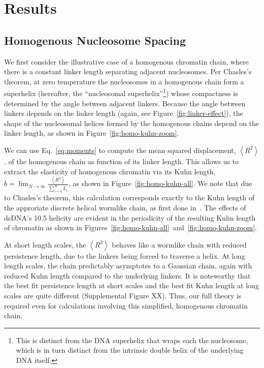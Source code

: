 \documentclass[%
 reprint,
superscriptaddress,
showpacs,preprintnumbers,
 amsmath,amssymb,
 aps,
 prl,
]{revtex4-1}
\newcommand{\RR}{\left\langle{}R^2\right\rangle{}}
\begin{document}
\section{\label{sec:model}Results}
\subsection{\label{sec:homo-kuhn}Homogenous Nucleosome Spacing}

We first consider the illustrative case of a homogenous chromatin chain, where
    there is a constant linker length separating adjacent nucleosomes.
Per Chasles's theorem, at zero temperature the nucleosomes in a homogenous chain
    form a superhelix (hereafter, the ``nucleosomal superhelix''\footnote{%
        This is distinct from the DNA superhelix that wraps each the nucleosome,
        which is in turn distinct from the intrinsic double helix of the
        underlying DNA itself.})
    whose compactness is determined by the angle between adjacent linkers.
Because the angle between linkers depends on the linker length (again, see
    Figure~\ref{fig:linker-effect}), the shape of the nucleosomal helices formed by
    the homogenous chains depend on the linker length, as shown in
    Figure~\ref{fig:homo-kuhn-zoom}.

We can use Eq.~\ref{eq:moments} to compute the mean squared displacement, $\RR$,
    of the homogenous chain as function of its linker length.
This allows us to extract the elasticity of homogenous chromatin via its Kuhn
    length, $b = \lim_{N\to\infty} \frac{\RR}{\sum_{i=0}^N L_i}$, as shown in
    Figure~\ref{fig:homo-kuhn-all}.
We note that due to Chasles's theorem, this calculation corresponds exactly to
    the Kuhn length of the approriate discrete helical wormlike chain, as first
    done in~\cite{yamakawa1976}.
The effects of dsDNA's \SI{10.5}{\basepair} helicity are evident in the
    periodicity of the resulting Kuhn length of chromatin as shown in
    Figures~\ref{fig:homo-kuhn-all}~and~\ref{fig:homo-kuhn-zoom}.

At short length scales, the $\RR$ behaves like a wormlike chain with reduced
    persistence length, due to the linkers being forced to traverse a helix.
At long length scales, the chain predictably asymptotes to a Gaussian
    chain, again with reduced Kuhn length compared to the underlying linkers.
It is noteworthy that the best fit persistence length at short scales and the
    best fit Kuhn length at long scales are quite different (Supplemental Figure
    XX).
Thus, our full theory is required even for calculations involving this
    simplified, homogenous chromatin chain.
\end{document}
